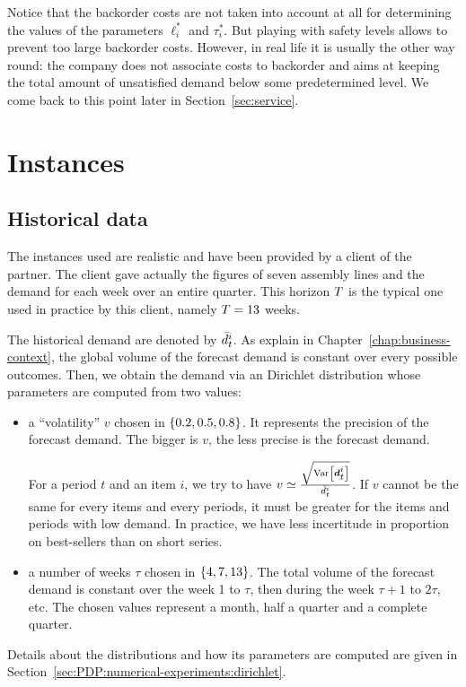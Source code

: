 Notice that the backorder costs are not taken into account at all for determining the values of the parameters $\ell_i^*$ and $\tau_i^*$.
But playing with safety levels allows to prevent too large backorder costs. However, in real life it is usually the other way round: the company does not associate costs to backorder and aims at keeping the total amount of unsatisfied demand below some predetermined level. We come back to this point later in Section~\ref{sec:service}.




\section{Instances}

\subsection{Historical data}
\label{sec:PDP:numerical-experiments:historical-data}

The instances used are realistic and have been provided by a client of the partner. The client gave actually the figures of seven assembly lines and the demand for each week over an entire quarter.
This horizon $T$ is the typical one used in practice by this client, namely $T=13$ weeks.

The historical demand are denoted by $\bar{d}_t^i$. As explain in Chapter~\ref{chap:business-context}, the global volume of the forecast demand is constant over every possible outcomes. Then, we obtain the demand via an Dirichlet distribution whose parameters are computed from two values:
\begin{itemize}
  \item a ``volatility'' $v$ chosen in $\crbracket{0.2,0.5, 0.8}$. It represents the precision of the forecast demand. The bigger is $v$, the less precise is the forecast demand.

  For a period $t$ and an item $i$, we try to have $v\simeq\frac{\sqrt{\vari\sqbracket{\va\demand_t^i}}}{\bar{\demand}_t^i}$. If $v$ cannot be the same for every items and every periods, it must be greater for the items and periods with low demand. In practice, we have less incertitude in proportion on best-sellers than on short series.
  \item a number of weeks $\tau$ chosen in $\crbracket{4,7,13}$. The total volume of the forecast demand is constant over the week 1 to $\tau$, then during the week $\tau+1$ to $2\tau$, etc. The chosen values represent a month, half a quarter and a complete quarter.
\end{itemize}
Details about the distributions and how its parameters are computed are given in Section~\ref{sec:PDP:numerical-experiments:dirichlet}.

